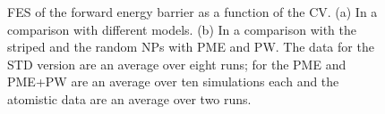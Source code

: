 \begin{figure}[pth]
	\centering
	\begin{adjustwidth}{-1.5cm}{-0.5cm}
		\caption{\acs{FES} of the forward energy barrier as a function of the \acs{CV}. (a) In a comparison with different models. (b) In a comparison with the striped and the random \acp{NP} with \acs{PME} and \acs{PW}. The data for the STD version are an average over eight runs; for the \acs{PME} and \acs{PME}+\acs{PW} are an average over ten simulations each and the atomistic data are an average over two runs.}%
		\label{fig:forwardWall}%

		\vspace*{\floatsep}%


\end{adjustwidth}
\end{figure}
